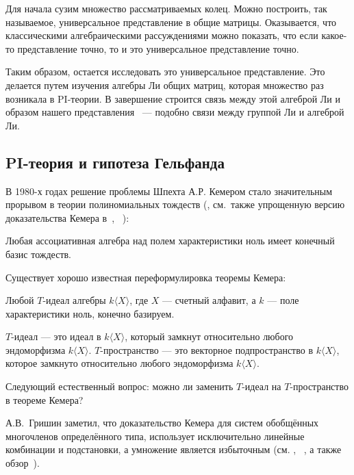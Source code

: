 Для начала сузим множество рассматриваемых колец.
Можно построить, так называемое, универсальное представление в общие матрицы.
Оказывается, что классическими алгебраическими рассуждениями можно показать, что если какое-то представление точно, то и это универсальное представление точно.

Таким образом, остается исследовать это универсальное представление.
Это делается путем изучения алгебры Ли общих матриц, которая множество раз возникала в PI-теории.
В завершение строится связь между этой алгеброй Ли и образом нашего представления ~--- подобно связи между группой Ли и алгеброй Ли.

\subsection{PI-теория и гипотеза Гельфанда}\label{subsec:introduction-gelfand}
В 1980-х годах решение проблемы Шпехта А.Р. Кемером стало значительным прорывом в теории полиномиальных тождеств (\cite{Kemer}, см.\ также упрощенную версию доказательства Кемера в~\cite{SimpleKemer}, ~\cite{Procesi}):
\vskip 0.1in\noindent
\begin{theorem*} [А.Р. Кемер, 1987]
    Любая ассоциативная алгебра над полем характеристики ноль имеет конечный базис тождеств.
\end{theorem*}
\vskip 0.1in\noindent

Существует хорошо известная переформулировка теоремы Кемера:

\vskip 0.1in\noindent
\begin{theorem*}
    Любой $T$-идеал алгебры $k\langle X\rangle$, где $X$ — счетный алфавит, а $k$ — поле характеристики ноль, конечно базируем.
\end{theorem*}
\vskip 0.1in\noindent

$T$-идеал — это идеал в $k\langle X\rangle$, который замкнут относительно любого эндоморфизма $k\langle X\rangle$.
$T$-пространство — это векторное подпространство в $k\langle X\rangle$, которое замкнуто относительно любого эндоморфизма $k\langle X\rangle$.

Следующий естественный вопрос: можно ли заменить $T$-идеал на $T$-пространство в теореме Кемера?

А.В.\ Гришин заметил, что доказательство Кемера для систем обобщённых многочленов определённого типа, использует исключительно линейные комбинации и подстановки, а умножение является избыточным (см. \cite{Grishin}, ~\cite{Grishin2}, а также обзор~\cite{GrishinSchigolev}).

